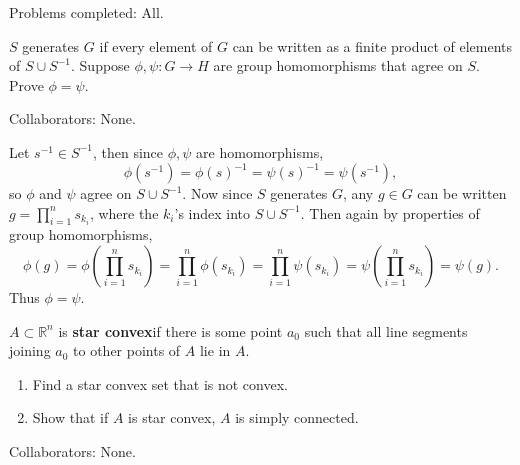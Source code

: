 \documentclass[10pt]{report}
\begin{document}

{\color{blue}Problems completed: All.}

\begin{exer}[]
	$S$ generates $G$ if every element of $G$ can be written as a finite product of elements of $S \cup S^{-1}$. Suppose $\phi,\psi:G\to H$ are group homomorphisms that agree on $S$. Prove $\phi=\psi$.
\end{exer}
{\color{blue}Collaborators: None.}

Let $s^{-1} \in S^{-1}$, then since $\phi,\psi$ are homomorphisms,
\[
	\phi(s^{-1}) = \phi(s)^{-1} = \psi(s)^{-1} = \psi(s^{-1}),
\] so $\phi$ and $\psi$ agree on $S \cup S^{-1}$. Now since $S$ generates $G$, any $g \in G$ can be written $g = \prod_{i=1}^n s_{k_i}$, where the $k_i$'s index into $S \cup S^{-1}$. Then again by properties of group homomorphisms,
\[
	\phi(g) = \phi \left( \prod_{i=1}^n s_{k_i} \right) = \prod_{i=1}^n \phi(s_{k_i}) = \prod_{i=1}^n \psi(s_{k_i}) = \psi \left( \prod_{i=1}^n s_{k_i} \right) = \psi(g).
\] 
Thus $\phi = \psi$.

\pagebreak
\begin{exer}[\S 52 pg. 334 \#1]
$A \subset \mathbb{R}^{n}$ is \textbf{star convex}if there is some point $a_0$ such that all line segments joining $a_0$ to other points of $A$ lie in $A$.
\begin{enumerate}
	\item Find a star convex set that is not convex.
	\item Show that if $A$ is star convex, $A$ is simply connected.
\end{enumerate}
\end{exer}
{\color{blue}Collaborators: None.}
\end{document}
